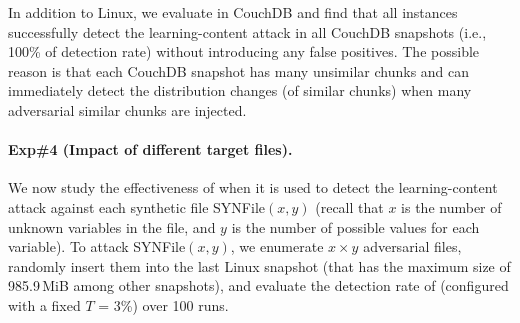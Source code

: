 
In addition to Linux, we evaluate \sysnameF in CouchDB and find that all \sysnameF instances successfully detect the learning-content attack in all CouchDB snapshots (i.e., 100\% of detection rate)  without introducing any false positives. The possible reason is that each CouchDB snapshot has many unsimilar chunks and \sysnameF can immediately detect the distribution changes (of similar chunks) when many adversarial similar chunks are injected.






\paragraph{Exp\#4 (Impact of different target files).}
We now study the effectiveness of \sysnameF when it is used to detect the learning-content attack against each synthetic file SYNFile$(x, y)$ (recall that $x$ is the number of unknown variables in the file, and $y$ is the number of possible values for each variable). To attack SYNFile$(x, y)$, we enumerate $x \times y$ adversarial files, randomly insert them into the last Linux snapshot (that has the maximum size of 985.9\,MiB among other snapshots), and evaluate the detection rate of \sysnameF  (configured with a fixed $T$ = 3\%) over 100 runs.



